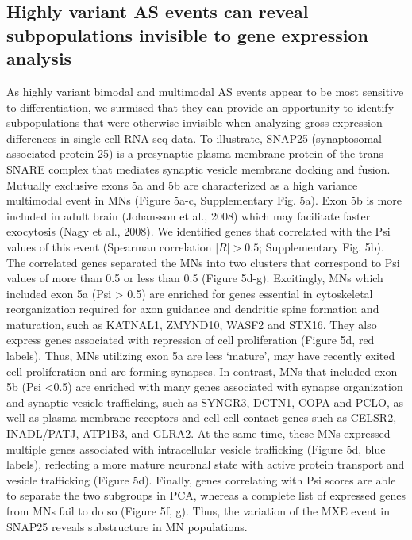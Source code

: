 \subsection{Highly variant AS events can reveal subpopulations invisible to gene expression analysis}

As highly variant bimodal and multimodal AS events appear to be most sensitive to differentiation, we surmised that they can provide an opportunity to identify subpopulations that were otherwise invisible when analyzing gross expression differences in single cell RNA-seq data. To illustrate, SNAP25 (synaptosomal-associated protein 25) is a presynaptic plasma membrane protein of the trans-SNARE complex that mediates synaptic vesicle membrane docking and fusion. Mutually exclusive exons 5a and 5b are characterized as a high variance multimodal event in MNs (Figure 5a-c, Supplementary Fig. 5a). Exon 5b is more included in adult brain (Johansson et al., 2008) which may facilitate faster exocytosis (Nagy et al., 2008). We identified genes that correlated with the Psi values of this event (Spearman correlation $|R| > 0.5$; Supplementary Fig. 5b). The correlated genes separated the MNs into two clusters that correspond to Psi values of more than 0.5 or less than 0.5 (Figure 5d-g). Excitingly, MNs which included exon 5a (Psi > 0.5) are enriched for genes essential in cytoskeletal reorganization required for axon guidance and dendritic spine formation and maturation, such as KATNAL1, ZMYND10, WASF2 and STX16. They also express genes associated with repression of cell proliferation (Figure 5d, red labels). Thus, MNs utilizing exon 5a are less ‘mature', may have recently exited cell proliferation and are forming synapses. In contrast, MNs that included exon 5b (Psi <0.5) are enriched with many genes associated with synapse organization and synaptic vesicle trafficking, such as SYNGR3, DCTN1, COPA and PCLO, as well as plasma membrane receptors and cell-cell contact genes such as CELSR2, INADL/PATJ, ATP1B3, and GLRA2. At the same time, these MNs expressed multiple genes associated with intracellular vesicle trafficking (Figure 5d, blue labels), reflecting a more mature neuronal state with active protein transport and vesicle trafficking (Figure 5d). Finally, genes correlating with Psi scores are able to separate the two subgroups in PCA, whereas a complete list of expressed genes from MNs fail to do so (Figure 5f, g). Thus, the variation of the MXE event in SNAP25 reveals substructure in MN populations.

